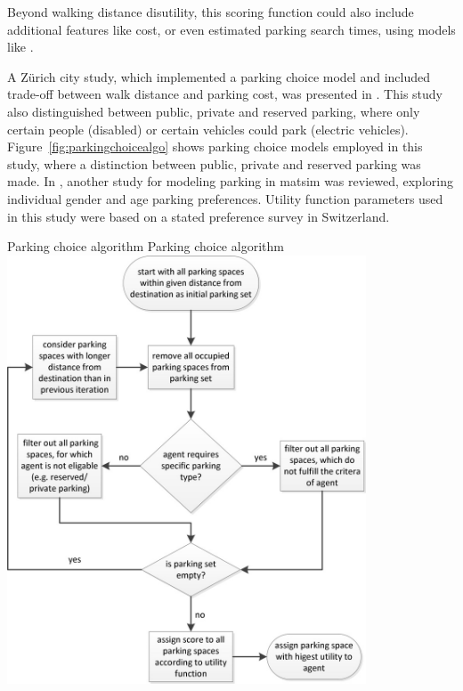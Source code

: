 Beyond walking distance disutility, this scoring function could also include additional features like cost, or even estimated parking search times, using models like \citet[][]{HorniEtAl_IATBRspec_2013}.

A Zürich city study, which implemented a parking choice model and included trade-off between walk distance and parking cost, was presented in \citet[][]{WaraichAxhausen_TRR_2012}. This study also distinguished between public, private and reserved parking, where only certain people (\eg disabled) or certain vehicles could park (\eg electric vehicles). Figure~\ref{fig:parkingchoicealgo} shows parking choice models employed in this study, where a distinction between public, private and reserved parking was made. In \citet[][]{WaraichEtAl_unpub_TRB_2013}, another study for modeling parking in \gls{matsim} was reviewed, exploring individual gender and age parking preferences. Utility function parameters used in this study were based on a stated preference survey in Switzerland.

\createfigure%
{Parking choice algorithm}%
{Parking choice algorithm}%
{\label{fig:parkingchoicealgo}}%
{\includegraphics[width=0.8\textwidth, angle=0]{extending/figures/Parking/parking_algo.png}}%
{\citet[][]{WaraichAxhausen_TRR_2012}}

